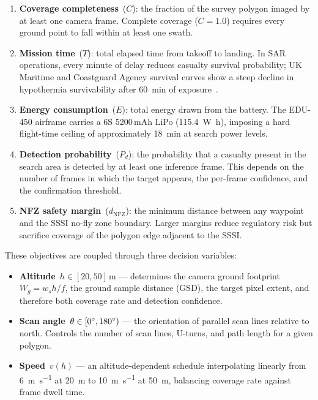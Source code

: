 \begin{enumerate}
  \item \textbf{Coverage completeness}~($C$): the fraction of the survey polygon imaged by at least one camera frame.
        Complete coverage ($C = 1.0$) requires every ground point to fall within at least one swath.
  \item \textbf{Mission time}~($T$): total elapsed time from takeoff to landing.
        In SAR operations, every minute of delay reduces casualty survival probability; UK Maritime and Coastguard Agency survival curves show a steep decline in hypothermia survivability after \SI{60}{\minute} of exposure~\cite{golden2006hypothermia}.
  \item \textbf{Energy consumption}~($E$): total energy drawn from the battery.
        The EDU-450 airframe carries a 6S 5200\,mAh LiPo (\SI{115.4}{\watt\hour}), imposing a hard flight-time ceiling of approximately \SI{18}{\minute} at search power levels.
  \item \textbf{Detection probability}~($P_d$): the probability that a casualty present in the search area is detected by at least one inference frame.
        This depends on the number of frames in which the target appears, the per-frame confidence, and the confirmation threshold.
  \item \textbf{NFZ safety margin}~($d_{\mathrm{NFZ}}$): the minimum distance between any waypoint and the SSSI no-fly zone boundary.
        Larger margins reduce regulatory risk but sacrifice coverage of the polygon edge adjacent to the SSSI.
\end{enumerate}

\noindent These objectives are coupled through three decision variables:

\begin{itemize}
  \item \textbf{Altitude}~$h \in [20, 50]$\,m --- determines the camera ground footprint~$W_g = w_s h / f$, the ground sample distance (GSD), the target pixel extent, and therefore both coverage rate and detection confidence.
  \item \textbf{Scan angle}~$\theta \in [0\degree, 180\degree)$ --- the orientation of parallel scan lines relative to north. Controls the number of scan lines, U-turns, and path length for a given polygon.
  \item \textbf{Speed}~$v(h)$ --- an altitude-dependent schedule interpolating linearly from \SI{6}{\metre\per\second} at \SI{20}{\metre} to \SI{10}{\metre\per\second} at \SI{50}{\metre}, balancing coverage rate against frame dwell time.
\end{itemize}

